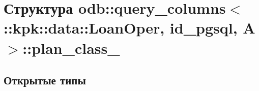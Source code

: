 \hypertarget{structodb_1_1query__columns_3_01_1_1kpk_1_1data_1_1_loan_oper_00_01id__pgsql_00_01_a_01_4_1_1plan__class__}{}\section{Структура odb\+:\+:query\+\_\+columns$<$ \+:\+:kpk\+:\+:data\+:\+:Loan\+Oper, id\+\_\+pgsql, A $>$\+:\+:plan\+\_\+class\+\_\+}
\label{structodb_1_1query__columns_3_01_1_1kpk_1_1data_1_1_loan_oper_00_01id__pgsql_00_01_a_01_4_1_1plan__class__}
\subsection*{Открытые типы}
